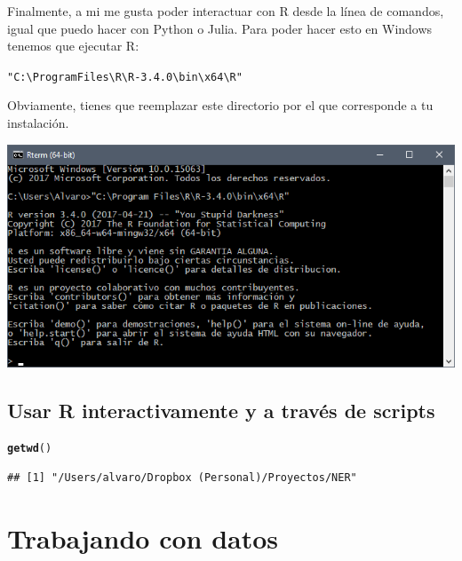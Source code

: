 \documentclass{article}\usepackage[]{graphicx}\usepackage[]{color}
\makeatletter
\newcommand{\hlstr}[1]{\textcolor[rgb]{0.192,0.494,0.8}{#1}}%
\newcommand{\hlstd}[1]{\textcolor[rgb]{0.345,0.345,0.345}{#1}}%
\newcommand{\hlkwd}[1]{\textcolor[rgb]{0.737,0.353,0.396}{\textbf{#1}}}%
\newenvironment{kframe}{%
 \def\at@end@of@kframe{}%
 \ifinner\ifhmode%
  \def\at@end@of@kframe{\end{minipage}}%
  \begin{minipage}{\columnwidth}%
 \fi\fi%
 \def\FrameCommand##1{\hskip\@totalleftmargin \hskip-\fboxsep
 \colorbox{shadecolor}{##1}\hskip-\fboxsep
     \hskip-\linewidth \hskip-\@totalleftmargin \hskip\columnwidth}%
 \MakeFramed {\advance\hsize-\width
   \@totalleftmargin\z@ \linewidth\hsize
   \@setminipage}}%
 {\par\unskip\endMakeFramed%
 \at@end@of@kframe}
\newenvironment{knitrout}{}{} %
\makeatother
\begin{document}
Finalmente, a mi me gusta poder interactuar con R desde la línea de comandos, igual que puedo hacer con Python o Julia. Para poder hacer esto en Windows tenemos que ejecutar R:

\begin{knitrout}
\color{fgcolor}\begin{kframe}
\begin{alltt}
\hlstr{"C:\textbackslash{}Program Files\textbackslash{}R\textbackslash{}R-3.4.0\textbackslash{}bin\textbackslash{}x64\textbackslash{}R"}
\end{alltt}
\end{kframe}
\end{knitrout}

Obviamente, tienes que reemplazar este directorio por el que corresponde a tu instalación. 

\includegraphics[width=\linewidth]{sss/r-win-command-prompt}

\subsection{Usar R interactivamente y a través de scripts}

\begin{knitrout}
\color{fgcolor}\begin{kframe}
\begin{alltt}
\hlkwd{getwd}\hlstd{()}
\end{alltt}
\begin{verbatim}
## [1] "/Users/alvaro/Dropbox (Personal)/Proyectos/NER"
\end{verbatim}
\end{kframe}
\end{knitrout}



\section{Trabajando con datos}
\end{document}
